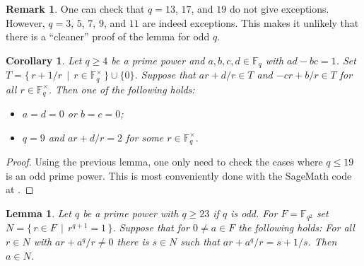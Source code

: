 \documentclass[12pt]{amsart}
\theoremstyle{plain}
\newtheorem{lemma}[theorem]{Lemma}
\newtheorem{corollary}[theorem]{Corollary}
\theoremstyle{definition}
\newtheorem{remark}[theorem]{Remark}
\numberwithin{equation}{section}
\newcommand*{\set}[1]{\{#1\}}
\newcommand*{\defset}[2]{\{\,#1\,\mid\,#2\,\}}
\newcommand{\FF}{\mathbb F}
\newcommand{\Fqs}{\FF_q^\times}
\begin{document}
\begin{remark}
  One can check that $q=13$, $17$, and $19$ do not give
  exceptions. However, $q=3$, $5$, $7$, $9$, and $11$ are indeed
  exceptions. This makes it unlikely that there is a ``cleaner'' proof
  of the lemma for odd $q$.
\end{remark}
\begin{corollary}\label{c:split}
  Let $q\ge4$ be a prime power and $a, b, c, d\in\FF_q$ with
  $ad-bc=1$. Set
  $T=\defset{r+1/r}{r\in\Fqs}\cup\set{0}$. Suppose that
  $ar+d/r\in T$ and $-cr+b/r\in T$ for all $r\in\Fqs$. Then one
  of the following holds:
  \begin{itemize}
  \item[(a)] $a=d=0$ or $b=c=0$;
  \item[(b)] $q=9$ and $ar+d/r=2$ for some $r\in\Fqs$.
  \end{itemize}
\end{corollary}
\begin{proof}
  Using the previous lemma, one only need to check the cases where
  $q\le19$ is an odd prime power. This is most conveniently done with
  the SageMath code at \cite{dera_psl2_verify}.
\end{proof}
\begin{lemma}
  Let $q$ be a prime power with $q\ge23$ if $q$ is odd. For
  $F=\FF_{q^2}$ set $N=\defset{r\in F}{r^{q+1}=1}$. Suppose that for
  $0\ne a\in F$ the following holds: For all $r\in N$ with
  $ar+a^q/r\ne0$ there is $s\in N$ such that $ar+a^q/r = s+1/s$. Then
  $a\in N$.
\end{lemma}
\end{document}
